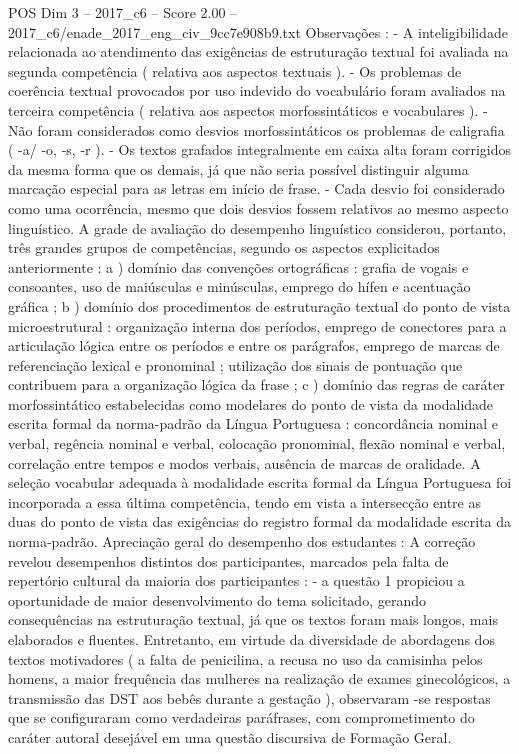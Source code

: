 \begin{textsample}{POS Dim 3 – 2017\_c6 – Score 2.00 – 2017\_c6/enade\_2017\_eng\_civ\_9cc7e908b9.txt}
Observações : - A inteligibilidade relacionada ao atendimento das exigências de estruturação textual foi avaliada na segunda competência ( relativa aos aspectos textuais ). - Os problemas de coerência textual provocados por uso indevido do vocabulário foram avaliados na terceira competência ( relativa aos aspectos morfossintáticos e vocabulares ). - Não foram considerados como desvios morfossintáticos os problemas de caligrafia ( -a/ -o, -s, -r ). - Os textos grafados integralmente em caixa alta foram corrigidos da mesma forma que os demais, já que não seria possível distinguir alguma marcação especial para as letras em início de frase. - Cada desvio foi considerado como uma ocorrência, mesmo que dois desvios fossem relativos ao mesmo aspecto linguístico.
A grade de avaliação do desempenho linguístico considerou, portanto, três grandes grupos de competências, segundo os aspectos explicitados anteriormente : a ) domínio das convenções ortográficas : grafia de vogais e consoantes, uso de maiúsculas e minúsculas, emprego do hífen e acentuação gráfica ; b ) domínio dos procedimentos de estruturação textual do ponto de vista microestrutural : organização interna dos períodos, emprego de conectores para a articulação lógica entre os períodos e entre os parágrafos, emprego de marcas de referenciação lexical e pronominal ; utilização dos sinais de pontuação que contribuem para a organização lógica da frase ; c ) domínio das regras de caráter morfossintático estabelecidas como modelares do ponto de vista da modalidade escrita formal da norma-padrão da Língua Portuguesa : concordância nominal e verbal, regência nominal e verbal, colocação pronominal, flexão nominal e verbal, correlação entre tempos e modos verbais, ausência de marcas de oralidade.
A seleção vocabular adequada à modalidade escrita formal da Língua Portuguesa foi incorporada a essa última competência, tendo em vista a intersecção entre as duas do ponto de vista das exigências do registro formal da modalidade escrita da norma-padrão.
Apreciação geral do desempenho dos estudantes : A correção revelou desempenhos distintos dos participantes, marcados pela falta de repertório cultural da maioria dos participantes : - a questão 1 propiciou a oportunidade de maior desenvolvimento do tema solicitado, gerando consequências na estruturação textual, já que os textos foram mais longos, mais elaborados e fluentes.
Entretanto, em virtude da diversidade de abordagens dos textos motivadores ( a falta de penicilina, a recusa no uso da camisinha pelos homens, a maior frequência das mulheres na realização de exames ginecológicos, a transmissão das DST aos bebês durante a gestação ), observaram -se respostas que se configuraram como verdadeiras paráfrases, com comprometimento do caráter autoral desejável em uma questão discursiva de Formação Geral.

\end{textsample}
